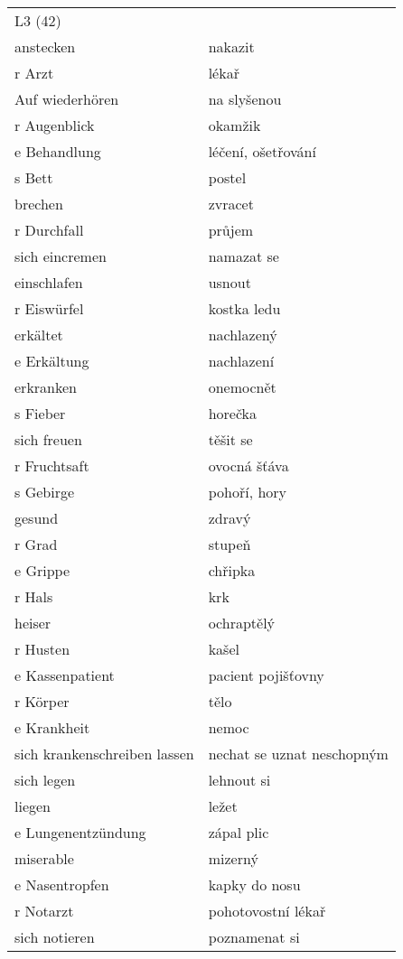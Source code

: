 \documentclass{article}
\begin{document}
\begin{tabular}{ p{5cm}|p{5cm}  }
    \\
    L3 (42) \\
    anstecken & nakazit\\
    r Arzt & lékař\\
    Auf wiederhören & na slyšenou\\
    r Augenblick & okamžik\\
    e Behandlung & léčení, ošetřování\\
    s Bett & postel\\
    brechen & zvracet\\
    r Durchfall & průjem\\
    sich eincremen & namazat se\\
    einschlafen & usnout\\
    r Eiswürfel & kostka ledu\\
    erkältet & nachlazený\\
    e Erkältung & nachlazení\\
    erkranken & onemocnět\\
    s Fieber & horečka\\
    sich freuen & těšit se\\
    r Fruchtsaft & ovocná šťáva\\
    s Gebirge & pohoří, hory\\
    gesund & zdravý\\
    r Grad & stupeň\\
    e Grippe & chřipka\\
    r Hals & krk\\
    heiser & ochraptělý\\
    r Husten & kašel\\
    e Kassenpatient & pacient pojišťovny\\
    r Körper & tělo\\
    e Krankheit & nemoc\\
    sich krankenschreiben lassen & nechat se uznat neschopným\\
    sich legen & lehnout si\\
    liegen & ležet\\
    e Lungenentzündung & zápal plic\\
    miserable & mizerný\\
    e Nasentropfen & kapky do nosu\\
    r Notarzt & pohotovostní lékař\\
    sich notieren & poznamenat si\\

\end{tabular}
\end{document}
